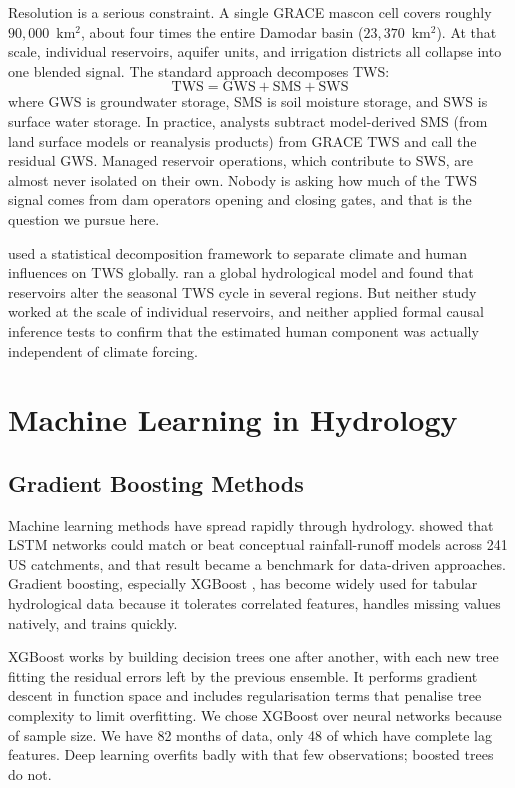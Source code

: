 \documentclass[12pt,a4paper,oneside]{report}
\begin{document}
Resolution is a serious constraint. A single GRACE mascon cell covers
roughly $90{,}000$~km$^2$, about four times the entire Damodar basin
($23{,}370$~km$^2$). At that scale, individual reservoirs, aquifer units,
and irrigation districts all collapse into one blended signal. The standard
approach decomposes TWS:
\begin{equation}
  \mathrm{TWS} = \mathrm{GWS} + \mathrm{SMS} + \mathrm{SWS}
  \label{eq:tws_decomp}
\end{equation}
where GWS is groundwater storage, SMS is soil moisture storage, and SWS is
surface water storage. In practice, analysts subtract model-derived SMS
(from land surface models or reanalysis products) from GRACE TWS and call
the residual GWS. Managed reservoir operations, which contribute to SWS,
are almost never isolated on their own. Nobody is asking how much of the
TWS signal comes from dam operators opening and closing gates, and that is
the question we pursue here.

\citet{Ji2023} used a statistical decomposition framework to separate
climate and human influences on TWS globally. \citet{Wada2017} ran a global
hydrological model and found that reservoirs alter the seasonal TWS cycle in
several regions. But neither study worked at the scale of individual
reservoirs, and neither applied formal causal inference tests to confirm
that the estimated human component was actually independent of climate
forcing.

\section{Machine Learning in Hydrology}

\subsection{Gradient Boosting Methods}

Machine learning methods have spread rapidly through hydrology.
\citet{Kratzert2019} showed that LSTM networks could match or beat
conceptual rainfall-runoff models across 241 US catchments, and that result
became a benchmark for data-driven approaches. Gradient boosting, especially
XGBoost \citep{Chen2016}, has become widely used for tabular hydrological
data because it tolerates correlated features, handles missing values
natively, and trains quickly.

XGBoost works by building decision trees one after another, with each new
tree fitting the residual errors left by the previous ensemble. It performs
gradient descent in function space and includes regularisation terms that
penalise tree complexity to limit overfitting. We chose XGBoost over neural
networks because of sample size. We have 82 months of data, only 48 of
which have complete lag features. Deep learning overfits badly with that
few observations; boosted trees do not.
\end{document}
